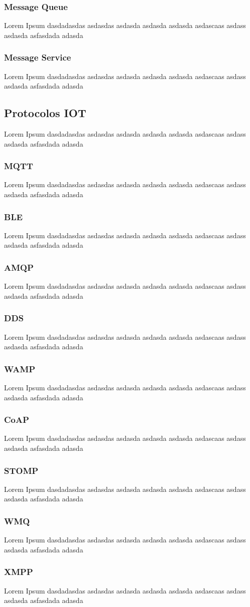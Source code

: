 \subsubsection{Message Queue}
Lorem Ipsum dasdadasdas asdasdas asdasda asdasda asdasda asdascaas asdass asdasda asfasdada adasda
\subsubsection{Message Service}

Lorem Ipsum dasdadasdas asdasdas asdasda asdasda asdasda asdascaas asdass asdasda asfasdada adasda
\subsection{Protocolos IOT}
Lorem Ipsum dasdadasdas asdasdas asdasda asdasda asdasda asdascaas asdass asdasda asfasdada adasda
\subsubsection{MQTT}
Lorem Ipsum dasdadasdas asdasdas asdasda asdasda asdasda asdascaas asdass asdasda asfasdada adasda
\subsubsection{BLE}
Lorem Ipsum dasdadasdas asdasdas asdasda asdasda asdasda asdascaas asdass asdasda asfasdada adasda
\subsubsection{AMQP}
Lorem Ipsum dasdadasdas asdasdas asdasda asdasda asdasda asdascaas asdass asdasda asfasdada adasda
\subsubsection{DDS}
Lorem Ipsum dasdadasdas asdasdas asdasda asdasda asdasda asdascaas asdass asdasda asfasdada adasda
\subsubsection{WAMP}
Lorem Ipsum dasdadasdas asdasdas asdasda asdasda asdasda asdascaas asdass asdasda asfasdada adasda
\subsubsection{CoAP}
Lorem Ipsum dasdadasdas asdasdas asdasda asdasda asdasda asdascaas asdass asdasda asfasdada adasda
\subsubsection{STOMP}
Lorem Ipsum dasdadasdas asdasdas asdasda asdasda asdasda asdascaas asdass asdasda asfasdada adasda
\subsubsection{WMQ}
Lorem Ipsum dasdadasdas asdasdas asdasda asdasda asdasda asdascaas asdass asdasda asfasdada adasda
\subsubsection{XMPP}
Lorem Ipsum dasdadasdas asdasdas asdasda asdasda asdasda asdascaas asdass asdasda asfasdada adasda